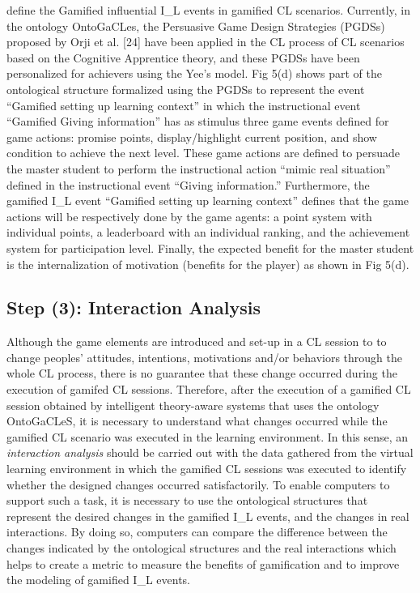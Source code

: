 \newpage %
define the Gamified influential I\_L events in gamified CL scenarios. Currently, in the ontology OntoGaCLes, the
Persuasive Game Design Strategies (PGDSs) proposed by Orji et al. [24] have been applied in the CL process of CL
scenarios based on the Cognitive Apprentice theory, and these PGDSs have been personalized for achievers using the Yee’s
model. Fig 5(d) shows part of the ontological structure formalized using the PGDSs to represent the event “Gamified
setting up learning context” in which the instructional event “Gamified Giving information” has as stimulus three game
events defined for game actions: promise points, display/highlight current position, and show condition to achieve the
next level. These game actions are defined to persuade the master student to perform the instructional action “mimic
real situation” defined in the instructional event “Giving information.” Furthermore, the gamified I\_L event “Gamified
setting up learning context” defines that the game actions will be respectively done by the game agents: a point system
with individual points, a leaderboard with an individual ranking, and the achievement system for participation level.
Finally, the expected benefit for the master student is the internalization of motivation (benefits for the player) as
shown in Fig 5(d).

\subsection*{Step (3): Interaction Analysis}

Although the game elements are introduced and set-up in a CL session to to change peoples’ attitudes, intentions,
motivations and/or behaviors through the whole CL process, there is no guarantee that these change occurred during the
execution of gamifed CL sessions. Therefore, after the execution of a gamified CL session obtained by intelligent
theory-aware systems that uses the ontology OntoGaCLeS, it is necessary to understand what changes occurred while the
gamified CL scenario was executed in the learning environment. In this sense, an \emph{interaction analysis} should be
carried out with the data gathered from the virtual learning environment in which the gamified CL sessions was executed
to identify whether the designed changes occurred satisfactorily. To enable computers to support such a task, it is
necessary to use the ontological structures that represent the desired changes in the gamified I\_L events, and the
changes in real interactions. By doing so, computers can compare the difference between the changes indicated by the
ontological structures and the real interactions which helps to create a metric to measure the benefits of gamification
and to improve the modeling of gamified I\_L events.

